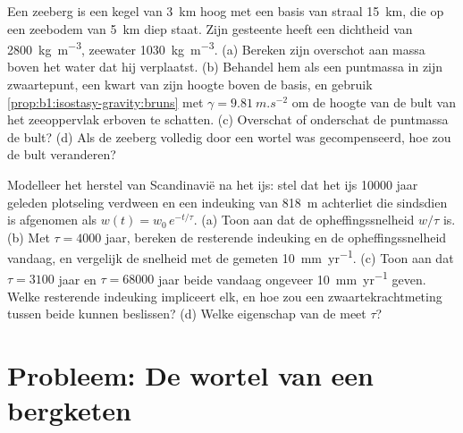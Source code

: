 \begin{exercise}[$\star\star\star$]\label{exo:b1:isostasy-gravity:11}
Een zeeberg is een kegel van \qty{3}{km} hoog met een basis van straal \qty{15}{km}, die op een zeebodem van \qty{5}{km} diep staat. Zijn gesteente heeft een dichtheid van \qty{2800}{kg.m^{-3}}, zeewater \qty{1030}{kg.m^{-3}}. (a) Bereken zijn overschot aan massa boven het water dat hij verplaatst. (b) Behandel hem als een puntmassa in zijn zwaartepunt, een kwart van zijn hoogte boven de basis, en gebruik \cref{prop:b1:isostasy-gravity:bruns} met $\gamma = \qty{9.81}{m.s^{-2}}$ om de hoogte van de bult van het zeeoppervlak erboven te schatten. (c) Overschat of onderschat de puntmassa de bult? (d) Als de zeeberg volledig door een wortel was gecompenseerd, hoe zou de bult veranderen?
\end{exercise}

\begin{exercise}[$\star\star\star$]\label{exo:b1:isostasy-gravity:12}
Modelleer het herstel van Scandinavië na het ijs: stel dat het ijs \num{10000} jaar geleden plotseling verdween en een indeuking van \qty{818}{m} achterliet die sindsdien is afgenomen als $w(t) = w_0\,e^{-t/\tau}$. (a) Toon aan dat de opheffingssnelheid $w/\tau$ is. (b) Met $\tau = \num{4000}$ jaar, bereken de resterende indeuking en de opheffingssnelheid vandaag, en vergelijk de snelheid met de gemeten \qty{10}{mm.yr^{-1}}. (c) Toon aan dat $\tau = \num{3100}$ jaar en $\tau = \num{68000}$ jaar beide vandaag ongeveer \qty{10}{mm.yr^{-1}} geven. Welke resterende indeuking impliceert elk, en hoe zou een zwaartekrachtmeting tussen beide kunnen beslissen? (d) Welke eigenschap van de  meet $\tau$?
\end{exercise}

\section{Probleem: De wortel van een bergketen}

